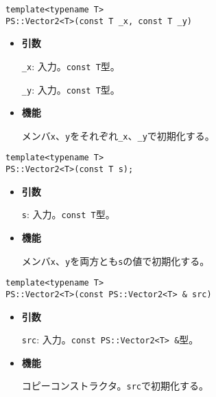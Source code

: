 \begin{screen}
\begin{verbatim}
template<typename T>
PS::Vector2<T>(const T _x, const T _y)
\end{verbatim}
\end{screen}

\begin{itemize}

\item{{\bf 引数}}

{\tt \_x}: 入力。{\tt const T}型。

{\tt \_y}: 入力。{\tt const T}型。

\item{{\bf 機能}}

メンバ{\tt x}、{\tt y}をそれぞれ{\tt \_x}、{\tt \_y}で初期化する。

\end{itemize}

\begin{screen}
\begin{verbatim}
template<typename T>
PS::Vector2<T>(const T s);
\end{verbatim}
\end{screen}

\begin{itemize}

\item{{\bf 引数}}

{\tt s}: 入力。{\tt const T}型。

\item{{\bf 機能}}

メンバ{\tt x}、{\tt y}を両方とも{\tt s}の値で初期化する。

\end{itemize}

\begin{screen}
\begin{verbatim}
template<typename T>
PS::Vector2<T>(const PS::Vector2<T> & src)
\end{verbatim}
\end{screen}

\begin{itemize}

\item{{\bf 引数}}

{\tt src}: 入力。{\tt const PS::Vector2<T> \&}型。

\item{{\bf 機能}}

コピーコンストラクタ。{\tt src}で初期化する。

\end{itemize}

